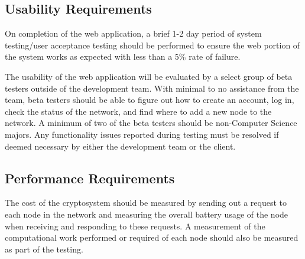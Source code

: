 \documentclass[tikz,a4paper,titlepage]{article}
\begin{document}
\subsection{Usability Requirements} %

On completion of the web application, a brief 1-2 day period of system testing/user acceptance testing should be performed to ensure the web portion of the system works as expected with less than a 5\% rate of failure.

The usability of the web application will be evaluated by a select group of beta testers outside of the development team. With minimal to no assistance from the team, beta testers should be able to figure out how to create an account, log in, check the status of the network, and find where to add a new node to the network. A minimum of two of the beta testers should be non-Computer Science majors. Any functionality issues reported during testing must be resolved if deemed necessary by either the development team or the client.

\subsection{Performance Requirements} %





The cost of the cryptosystem should be measured by sending out a request to each node in the network and measuring the overall battery usage of the node when receiving and responding to these requests. A measurement of the computational work performed or required of each node should also be measured as part of the testing.
\end{document}

